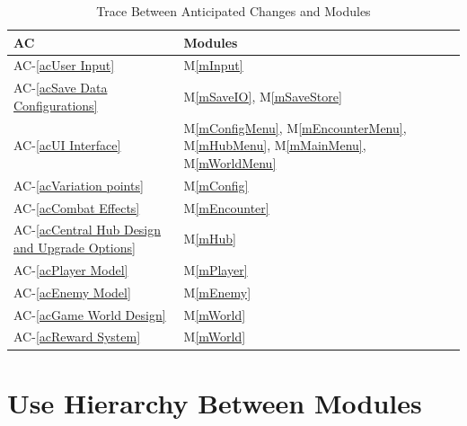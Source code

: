 \documentclass[12pt, titlepage]{article}
\newcommand{\acref}[1]{AC-\ref{#1}}
\newcommand{\mref}[1]{M\ref{#1}}
\begin{document}
\begin{table}[H]
\centering
\begin{tabular}{p{} p{}}
\toprule
\textbf{AC} & \textbf{Modules}\\
\midrule
\acref{acUser Input} & \mref{mInput} \\
\acref{acSave Data Configurations} & \mref{mSaveIO}, \mref{mSaveStore} \\
\acref{acUI Interface} & \mref{mConfigMenu}, \mref{mEncounterMenu}, \mref{mHubMenu}, \mref{mMainMenu}, \mref{mWorldMenu} \\
\acref{acVariation points} & \mref{mConfig} \\
\acref{acCombat Effects} & \mref{mEncounter} \\ 
\acref{acCentral Hub Design and Upgrade Options} & \mref{mHub} \\
\acref{acPlayer Model} & \mref{mPlayer} \\
\acref{acEnemy Model} & \mref{mEnemy} \\
\acref{acGame World Design} & \mref{mWorld} \\
\acref{acReward System} & \mref{mWorld} \\


\bottomrule
\end{tabular}
\caption{Trace Between Anticipated Changes and Modules}
\label{TblACT}
\end{table}

\section{Use Hierarchy Between Modules} \label{SecUse}
\end{document}
